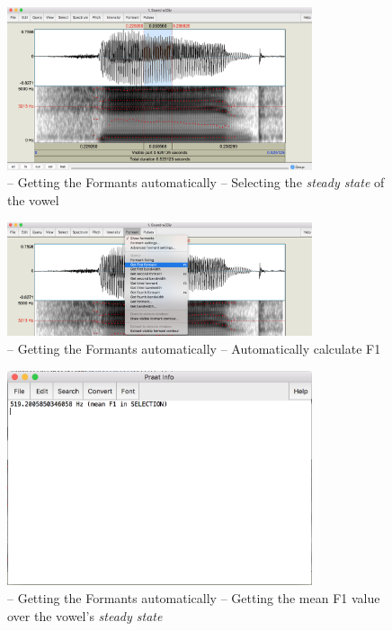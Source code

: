 \begin{figure}[!tbp]
\caption{\Praat{} -- Getting the Formants automatically -- Selecting the \emph{steady state} of the vowel}
\label{praat-select-steady-state}
	\begin{center}
		\includegraphics[width=0.8\textwidth]{./figures/Praat-07-Select-steady-state-vowel}
	\end{center}
\end{figure}

\begin{figure}[!tbp]
\caption{\Praat{} -- Getting the Formants automatically -- Automatically calculate F1}
\label{praat-get-F1}
	\begin{center}
		\includegraphics[width=0.8\textwidth]{./figures/Praat-08-Get-F1-from-selection}
	\end{center}
\end{figure}

\begin{figure}[!tbp]
\caption{\Praat{} -- Getting the Formants automatically -- Getting the mean F1 value over the vowel's \emph{steady state}}
\label{praat-mean-F1}
	\begin{center}
		\includegraphics[width=0.8\textwidth]{./figures/Praat-09-Praat-info-window-F1}
	\end{center}
\end{figure}

